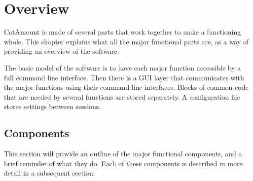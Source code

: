 \chapter{Overview}
\hypertarget{overview}{}

CatAmount is made of several parts that work together to make a
functioning whole. This chapter explains what all the major functional
parts are, as a way of providing an overview of the software.

The basic model of the software is to have each major function
accessible by a full command line interface. Then there is a GUI layer
that communicates with the major functions using their command line
interfaces. Blocks of common code that are needed by several functions
are stored separately. A configuration file stores settings between
sessions.


\section{Components}

This section will provide an outline of the major functional
components, and a brief reminder of what they do. Each of these
components is described in more detail in a subsequent section.

